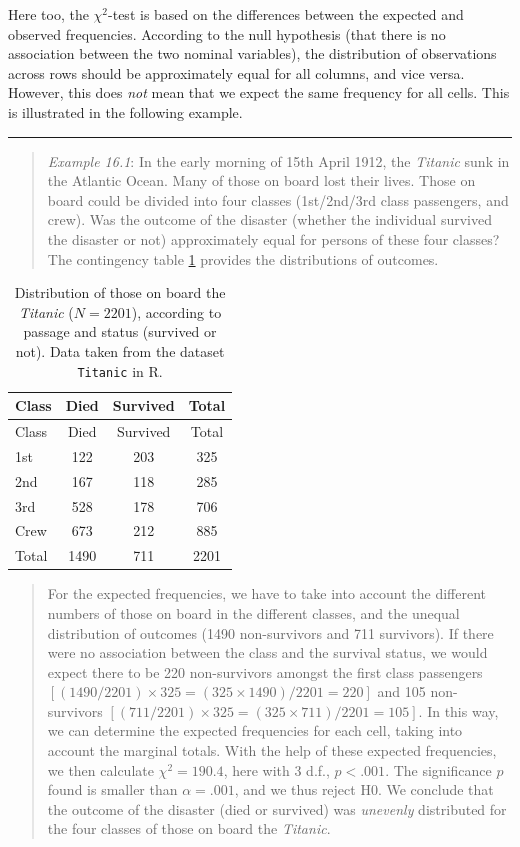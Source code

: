 \documentclass[
]{book}
\begin{document}
Here too, the \(\chi^2\)-test is based on the differences between the expected and
observed frequencies. According to the null hypothesis (that there is no association
between the two nominal variables), the distribution of observations across
rows should be approximately equal for all columns, and vice versa. However, this
does \emph{not} mean that we expect the same frequency for all cells.
This is illustrated in the following example.

\begin{center}\rule{0.5\linewidth}{0.5pt}\end{center}

\begin{quote}
\emph{Example 16.1}: In the early morning of 15th April 1912, the \emph{Titanic}
sunk in the Atlantic Ocean. Many of those on board lost their lives.
Those on board could be divided into four classes (1st/2nd/3rd class passengers, and crew). Was the outcome of the disaster (whether the individual survived the
disaster or not) approximately equal for persons of these four classes?
The contingency table \ref{tab:titanic} provides the distributions of
outcomes.
\end{quote}

\begin{longtable}[]{@{}lccc@{}}
\caption{\label{tab:titanic} Distribution of those on board the \emph{Titanic} (\(N=2201\)),
according to passage
and status (survived or not). Data taken from the dataset
\texttt{Titanic} in R.}\tabularnewline
\toprule\noalign{}
Class & Died & Survived & Total \\
\midrule\noalign{}
\endfirsthead
\toprule\noalign{}
Class & Died & Survived & Total \\
\midrule\noalign{}
\endhead
\bottomrule\noalign{}
\endlastfoot
1st & 122 & 203 & 325 \\
2nd & 167 & 118 & 285 \\
3rd & 528 & 178 & 706 \\
Crew & 673 & 212 & 885 \\
Total & 1490 & 711 & 2201 \\
\end{longtable}

\begin{quote}
For the expected frequencies, we have to take into account
the different numbers of those on board in the different classes,
and the unequal distribution of outcomes (1490 non-survivors and 711
survivors). If there were no association between the class and the survival
status, we would expect there to be 220 non-survivors amongst the first class
passengers \([(1490/2201) \times 325 = (325 \times 1490) / 2201 = 220]\)
and 105 non-survivors \([(711/2201) \times 325 = (325 \times 711) / 2201 = 105]\). In this way, we can determine the expected frequencies for each cell,
taking into account the marginal totals. With the help of these
expected frequencies, we then calculate \(\chi^2=190.4\), here with 3 d.f.,
\(p<.001\). The significance \(p\) found is smaller than \(\alpha=.001\), and
we thus reject H0. We conclude that the outcome of the disaster (died or survived)
was \emph{unevenly} distributed for the four classes of those on board the \emph{Titanic}.
\end{quote}
\end{document}
